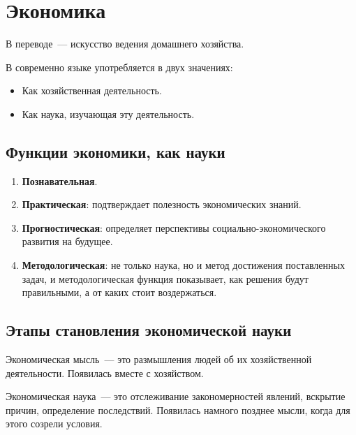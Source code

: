 \documentclass[12pt]{article}
\begin{document}
	\section{Экономика}
	
	\begin{definition}[Экономика]
		В переводе~--- искусство ведения домашнего хозяйства.
		
		В современно языке употребляется в двух значениях:
		
		\begin{itemize}
			\item Как хозяйственная деятельность.
			\item Как наука, изучающая эту деятельность.
		\end{itemize}
	\end{definition}
	
	\subsection{Функции экономики, как науки}
	
	\begin{enumerate}
		\item \textbf{Познавательная}.
		\item \textbf{Практическая}: подтверждает полезность экономических знаний.
		\item \textbf{Прогностическая}: определяет перспективы социально-экономического развития на будущее.
		\item \textbf{Методологическая}: не только наука, но и метод достижения поставленных задач, и методологическая функция показывает, как решения будут правильными, а от каких стоит воздержаться.
	\end{enumerate}
	
	\subsection{Этапы становления экономической науки}
	
	\begin{definition}
		Экономическая мысль~--- это размышления людей об их хозяйственной деятельности. Появилась вместе с хозяйством.
		
		Экономическая наука~--- это отслеживание закономерностей явлений, вскрытие причин, определение последствий. Появилась намного позднее мысли, когда для этого созрели условия.
	\end{definition}
	
\end{document}
